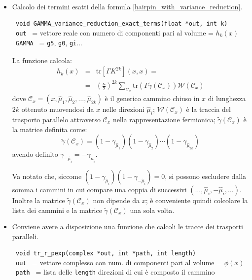 \documentclass[a4paper]{article}
\newcommand{\tr}{\mathrm{tr}}
\begin{document}
\begin{itemize}

\item Calcolo dei termini esatti della formula \ref{hairpin_with_variance_reduction}.\\
\verb| |\\
\verb| void GAMMA_variance_reduction_exact_terms(float *out, int k)|\\
\verb| out | = vettore reale con numero di componenti pari al volume = $h_k(x)$ \\
\verb| GAMMA | = \verb|g5|, \verb|g0|, \verb|gi|... \\
\verb| |\\

La funzione calcola:
\begin{eqnarray}
h_k(x) &=& \tr \left[ \Gamma K^{2k} \right](x,x) = \nonumber \\
&=& \left( \frac{\kappa}{2} \right)^{2k} \sum_{\mathcal{C}_x} \tr \left( \Gamma \tilde{\gamma}(\mathcal{C}_x) \right) \mathcal{W}(\mathcal{C}_x)
\end{eqnarray}
dove $\mathcal{C}_x = (x,\hat{\mu}_1,\hat{\mu}_2,\dots,\hat{\mu}_{2k})$ \`{e} il generico cammino chiuso in $x$ di lunghezza $2k$ ottenuto muovendosi da $x$ nelle direzioni $\hat{\mu}_i$; $\mathcal{W}(\mathcal{C}_x)$ \`{e} la traccia del trasporto parallelo attraverso $\mathcal{C}_x$ nella rappresentazione fermionica; $\tilde{\gamma}(\mathcal{C}_x)$ \`{e} la matrice definita come:
$$
\tilde{\gamma}(\mathcal{C}_x) = (1-\gamma_{\hat{\mu}_1})(1-\gamma_{\hat{\mu}_2})\cdots(1-\gamma_{\hat{\mu}_{2k}})
$$
avendo definito $ \gamma_{-\hat{\mu}_i} = - \gamma_{\hat{\mu}_i} $.

Va notato che, siccome $(1-\gamma_{\hat{\mu}_i})(1-\gamma_{-\hat{\mu}_i}) = 0$, si possono escludere dalla somma i cammini in cui compare una coppia di successivi $(\dots, \hat{\mu}_i,-\hat{\mu}_i, \dots)$. Inoltre la matrice $\tilde{\gamma}(\mathcal{C}_x)$ non dipende da $x$; \`{e} conveniente quindi colcolare la lista dei cammini e la matrice $\tilde{\gamma}(\mathcal{C}_x)$ una sola volta.

\item Conviene avere a disposizione una funzione che calcoli le tracce dei trasporti paralleli.\\
\verb| |\\
\verb| void tr_r_pexp(complex *out, int *path, int length)|\\
\verb| out | = vettore complesso con num. di componenti pari al volume = $\phi(x)$ \\
\verb| path | = lista delle \verb|length| direzioni di cui \`{e} composto il cammino \\
\verb| |\\


\end{itemize}
\end{document}
